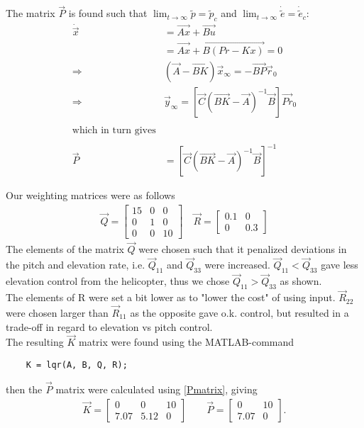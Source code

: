 The matrix $\vec{P}$ is found such that $\lim_{t\rightarrow\infty}\tilde{p}=\tilde{p}_c$ and $\lim_{t\rightarrow\infty}\dot{\tilde{e}} = \dot{\tilde{e}}_c$:
\begin{align}
    \dot{\vec{x}} &= \vec{Ax} + \vec{Bu}    \nonumber\\ \nonumber
    &= \vec{Ax} + \vec{B(Pr-Kx)} = 0\\\nonumber
    \Rightarrow& (\vec{A}-\vec{BK})\vec{x}_\infty = -\vec{BP}\vec{r}_0\\\nonumber
    \Rightarrow& \vec{y}_\infty = [\vec{C}(\vec{BK}-\vec{A})^{-1}\vec{B}]\vec{Pr}_0 \nonumber\\ \nonumber\\
    \text{which in turn gives}\nonumber\\ \nonumber\\
    \vec{P} &= [\vec{C}(\vec{BK}-\vec{A})^{-1}\vec{B}]^{-1} \label{Pmatrix}
\end{align}



Our weighting matrices were as follows
%
\begin{align*}
    \vec{Q} = \begin{bmatrix}
                15&0&0\\
                0&1&0\\
                0&0&10
            \end{bmatrix} 
    \quad
    \vec{R} = \begin{bmatrix}
                0.1&0\\
                0&0.3
            \end{bmatrix}
\end{align*}
%
The elements of the matrix $\vec{Q}$ were chosen such that it penalized deviations in the pitch and elevation rate, i.e. $\vec{Q}_{11}$ and $\vec{Q}_{33}$ were increased. $\vec{Q}_{11} < \vec{Q}_{33}$ gave less elevation control from the helicopter, thus we chose $\vec{Q}_{11} > \vec{Q}_{33}$ as shown. \\
The elements of R were set a bit lower as to "lower the cost" of using input. $\vec{R}_{22}$ were chosen larger than $\vec{R}_{11}$ as the opposite gave o.k. control, but resulted in a trade-off in regard to elevation vs pitch control. \\

The resulting $\vec{K}$ matrix were found using the MATLAB-command 
%
\begin{lstlisting}  
    K = lqr(A, B, Q, R);
\end{lstlisting}
%
then the $\vec{P}$ matrix were calculated using \cref{Pmatrix}, giving
%
\begin{align*}
    \vec{K} =   \begin{bmatrix}
                    0       & 0      & 10 \\
                    7.07    & 5.12   & 0
                 \end{bmatrix}
        \quad \quad
    \vec{P} =   \begin{bmatrix}
                    0       & 10 \\
                    7.07    & 0
                \end{bmatrix} .
\end{align*}
%
%
%
